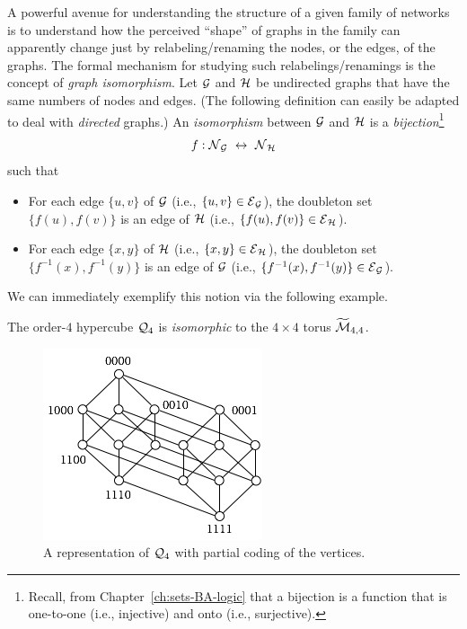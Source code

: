A powerful avenue for understanding the structure of a given family of
networks is to understand how the perceived ``shape'' of graphs in the
family can apparently change just by relabeling/renaming the nodes, or
the edges, of the graphs.  The formal mechanism for studying such
relabelings/renamings is the concept of {\it graph isomorphism}.
 Let $\mbox{$\cal G$}$ and $\mbox{$\cal H$}$ be undirected graphs that
have the same numbers of nodes and edges.  (The following definition
can easily be adapted to deal with {\em directed} graphs.)  An {\it
  isomorphism} between $\mbox{$\cal G$}$ and $\mbox{$\cal H$}$ is a {\em
  bijection}\footnote{Recall, from Chapter~\ref{ch:sets-BA-logic} that
  a bijection is a function that is one-to-one (i.e., injective) and
  onto (i.e., surjective).}
\[ f: \mbox{$\cal N$}_{\mbox{{\scriptsize $\cal G$}}} \ \leftrightarrow \ \mbox{$\cal N$}_{\mbox{{\scriptsize $\cal H$}}} \]
such that
\begin{itemize}
\item
For each edge $\{ u,v \}$ of $\mbox{$\cal G$}$ (i.e., $\{ u,v \} \in \mbox{$\cal E$}_{\mbox{{\scriptsize $\cal G$}}}$),
the doubleton set $\{ f(u), f(v) \}$ is an edge of $\mbox{$\cal H$}$ (i.e.,
$\{ f(u), f(v) \} \in \mbox{$\cal E$}_{\mbox{{\scriptsize $\cal H$}}}$).
\item
For each edge $\{ x,y \}$ of $\mbox{$\cal H$}$ (i.e., $\{ x,y \} \in \mbox{$\cal E$}_{\mbox{{\scriptsize $\cal H$}}}$),
the doubleton set $\{ f^{-1}(x), f^{-1}(y) \}$ is an edge of $\mbox{$\cal G$}$ (i.e.,
$\{ f^{-1}(x), f^{-1}(y) \} \in \mbox{$\cal E$}_{\mbox{{\scriptsize $\cal G$}}}$).
\end{itemize}
We can immediately exemplify this notion via the following example.

\begin{prop}
The order-$4$ hypercube $\mbox{$\cal Q$}_4$ is \textit{isomorphic} to the $4 \times
4$ torus $\widetilde{\mbox{$\cal M$}}_{4,4}$.
\label{prop.graphIsomorphism}
\end{prop}

\begin{figure}[hbt]
\begin{center}
       \includegraphics[scale=0.6]{FiguresGraph/Isomorphism1}
       \caption{A representation of $\mbox{$\cal Q$}_4$ with partial coding of the vertices.}
  \label{fig:isomorphism1}
\end{center}
\end{figure}

